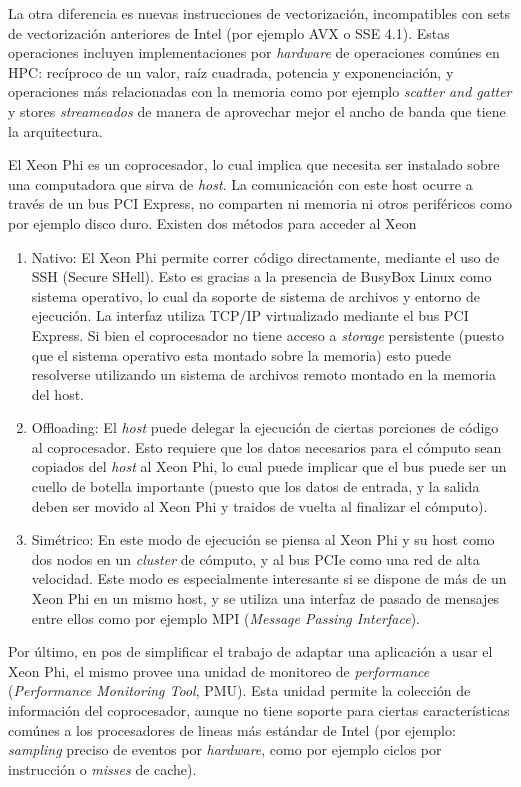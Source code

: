 La otra diferencia es nuevas instrucciones de vectorizaci\'on, incompatibles con sets de vectorizaci\'on anteriores de Intel (por ejemplo AVX o SSE 4.1).
Estas operaciones incluyen implementaciones por \textit{hardware} de operaciones com\'unes en HPC: rec\'iproco de un valor, ra\'iz cuadrada, potencia y
exponenciaci\'on, y operaciones m\'as relacionadas con la memoria como por ejemplo \textit{scatter and gatter} y stores \textit{streameados} de manera de aprovechar
mejor el ancho de banda que tiene la arquitectura.

El Xeon Phi es un coprocesador, lo cual implica que necesita ser instalado sobre una computadora que sirva de \textit{host}. La comunicaci\'on con este host
ocurre a trav\'es de un bus PCI Express, no comparten ni memoria ni otros perif\'ericos como por ejemplo disco duro. Existen dos m\'etodos para acceder al Xeon~\cite{BookXeonPhi}

\begin{enumerate}
    \item Nativo: El Xeon Phi permite correr c\'odigo directamente, mediante el uso de SSH (Secure SHell). Esto es gracias a la presencia de BusyBox Linux como sistema operativo,
    lo cual da soporte de sistema de archivos y entorno de ejecuci\'on. La interfaz utiliza TCP/IP virtualizado mediante el bus PCI Express. Si bien el coprocesador no tiene acceso a \textit{storage} persistente (puesto que el sistema operativo esta montado sobre la memoria) esto puede resolverse utilizando un sistema de archivos remoto montado en la memoria del host.
    \item Offloading: El \textit{host} puede delegar la ejecuci\'on de ciertas porciones de c\'odigo al coprocesador. Esto requiere que los datos necesarios para el c\'omputo sean copiados del \textit{host} al Xeon Phi, lo cual puede implicar que el bus puede ser un cuello de botella importante (puesto que los datos de entrada, y la salida deben ser movido al Xeon Phi y traidos de vuelta al finalizar el c\'omputo).
    \item Simétrico: En este modo de ejecuci\'on se piensa al Xeon Phi y su host como dos nodos en un \textit{cluster} de c\'omputo, y al bus PCIe como una red de alta velocidad.
Este modo es especialmente interesante si se dispone de m\'as de un Xeon Phi en un mismo host, y se utiliza una interfaz de pasado de mensajes entre ellos como por ejemplo MPI (\textit{Message Passing Interface}).
\end{enumerate}

Por \'ultimo, en pos de simplificar el trabajo de adaptar una aplicaci\'on a usar el Xeon Phi, el mismo provee una unidad de monitoreo de \textit{performance} (\textit{Performance
Monitoring Tool}, PMU). Esta unidad permite la colecci\'on de informaci\'on del coprocesador, aunque no tiene soporte para ciertas caracter\'isticas com\'unes a los procesadores
de lineas m\'as est\'andar de Intel (por ejemplo: \textit{sampling} preciso de eventos por \textit{hardware}, como por ejemplo ciclos por instrucci\'on o \textit{misses} de cache).



